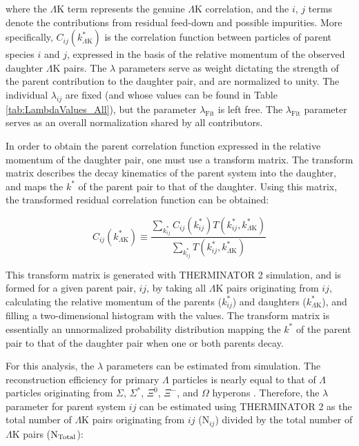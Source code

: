 \documentclass[ALICE,manyauthors]{cernphprep}
\newcommand{\kstar}{$k^{*}$\xspace}
\newcommand{\Lam}{$\Lambda$\xspace}
\newcommand{\LamK}{$\Lambda$K\xspace}
\begin{document}
where the \LamK term represents the genuine \LamK correlation, and the $i$, $j$ terms denote the contributions from residual feed-down and possible impurities.
More specifically, $C_{ij}(k^{*}_{\Lambda\mathrm{K}})$ is the correlation function between particles of parent species $i$ and $j$, expressed in the basis of the relative momentum of the observed daughter \LamK pairs.  
The $\lambda$ parameters serve as weight dictating the strength of the parent contribution to the daughter pair, and are normalized to unity.
The individual $\lambda_{ij}$ are fixed (and whose values can be found in Table \ref{tab:LambdaValues_All}), but the parameter $\lambda_{\mathrm{Fit}}$ is left free.
The $\lambda_{\mathrm{Fit}}$ parameter serves as an overall normalization shared by all contributors.

In order to obtain the parent correlation function expressed in the relative momentum of the daughter pair, one must use a transform matrix.
The transform matrix describes the decay kinematics of the parent system into the daughter, and maps the \kstar of the parent pair to that of the daughter.
Using this matrix, the transformed residual correlation function can be obtained:


\begin{equation}
  C_{ij}(k^{*}_{\Lambda\mathrm{K}}) \equiv \frac{\sum\limits_{k^{*}_{ij}} C_{ij}\left(k^{*}_{ij}\right) T\left(k^{*}_{ij},k^{*}_{\Lambda\mathrm{K}}\right)}{\sum\limits_{k^{*}_{ij}} T\left(k^{*}_{ij},k^{*}_{\Lambda\mathrm{K}}\right)}
\label{eqn:ResidualsTransform}
\end{equation}


This transform matrix is generated with THERMINATOR 2 \cite{Chojnacki:2011hb} simulation, and is formed for a given parent pair, $ij$, by taking all \LamK pairs originating from $ij$, calculating the relative momentum of the parents ($k^{*}_{ij}$) and daughters ($k^{*}_{\Lambda\mathrm{K}}$), and filling a two-dimensional histogram with the values. 
The transform matrix is essentially an unnormalized probability distribution mapping the \kstar of the parent pair to that of the daughter pair when one or both parents decay.


For this analysis, the $\lambda$ parameters can be estimated from simulation.  
The reconstruction efficiency for primary \Lam particles is nearly equal to that of \Lam particles originating from $\Sigma$, $\Sigma^{*}$, $\Xi^{0}$, $\Xi^{-}$, and $\Omega$ hyperons \cite{Salzwedel:2241303}.  
Therefore, the $\lambda$ parameter for parent system $ij$ can be estimated using THERMINATOR 2 as the total number of \LamK pairs originating from $ij$ ($\mathrm{N}_{ij}$) divided by the total number of \LamK pairs ($\rm N_{Total}$): 
\end{document}
